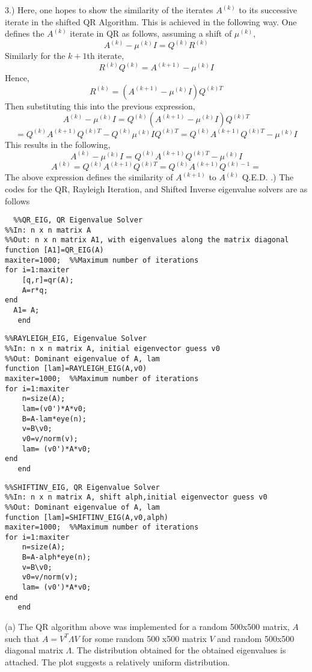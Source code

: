 \documentclass{article}
\begin{document}
3.) \newline 
Here, one hopes to show the similarity of the iterates $A^{(k)}$  to its successive iterate in the shifted QR Algorithm. This is achieved in the following way. One defines the $A^{(k)}$  iterate in QR as follows, assuming a shift of $\mu^{(k)}$, 
$$ A^{(k)} - \mu^{(k)}I = Q^{(k)}R^{(k)}$$ 
Similarly for the $k+1$th iterate, 
$$ R^{(k)}Q^{(k)} =   A^{(k+1)} -  \mu^{(k)}I $$ 
Hence, 
$$  R^{(k)} =  (A^{(k+1)} -  \mu^{(k)}I)Q^{(k)T} $$ 
Then  substituting this into the previous expression, 
$$ A^{(k)} - \mu^{(k)}I=   Q^{(k)}( A^{(k+1)} -  \mu^{(k)}I)Q^{(k)T}$$ 
$$ =Q^{(k)}A^{(k+1)}Q^{(k)T} - Q^{(k)} \mu^{(k)}IQ^{(k)T} = Q^{(k)}A^{(k+1)}Q^{(k)T} -\mu^{(k)}I  
$$ 
This results in the following, 
$$ A^{(k)} - \mu^{(k)}I =  Q^{(k)}A^{(k+1)}Q^{(k)T} -\mu^{(k)}I  $$ 
$$A^{(k)} = Q^{(k)}A^{(k+1)}Q^{(k)T} = Q^{(k)}A^{(k+1)}Q^{(k)-1} = 
$$ 
The above expression defines the similarity of $A^{(k+1)}$ to $A^{(k)}$  Q.E.D. 
\newline {}.) \newline  
The codes for the QR, Rayleigh Iteration, and Shifted Inverse eigenvalue solvers are as follows 
  \begin{lstlisting} 
  %%QR_EIG, QR Eigenvalue Solver 
%%In: n x n matrix A 
%%Out: n x n matrix A1, with eigenvalues along the matrix diagonal 
function [A1]=QR_EIG(A)  
maxiter=1000;  %%Maximum number of iterations 
for i=1:maxiter 
    [q,r]=qr(A); 
    A=r*q; 
end 
  A1= A; 
   end
 \end{lstlisting} 
\begin{lstlisting} 
%%RAYLEIGH_EIG, Eigenvalue Solver 
%%In: n x n matrix A, initial eigenvector guess v0  
%%Out: Dominant eigenvalue of A, lam 
function [lam]=RAYLEIGH_EIG(A,v0)  
maxiter=1000;  %%Maximum number of iterations 
for i=1:maxiter 
    n=size(A); 
    lam=(v0')*A*v0; 
    B=A-lam*eye(n); 
    v=B\v0; 
    v0=v/norm(v); 
    lam= (v0')*A*v0; 
end 
   end
\end{lstlisting} 
\begin{lstlisting} 
%%SHIFTINV_EIG, QR Eigenvalue Solver 
%%In: n x n matrix A, shift alph,initial eigenvector guess v0 
%%Out: Dominant eigenvalue of A, lam  
function [lam]=SHIFTINV_EIG(A,v0,alph)  
maxiter=1000;  %%Maximum number of iterations 
for i=1:maxiter 
    n=size(A); 
    B=A-alph*eye(n); 
    v=B\v0; 
    v0=v/norm(v); 
    lam= (v0')*A*v0; 
end 
   end
\end{lstlisting} 
 (a) The QR algorithm above was implemented for a random 500x500 matrix, $A$ such that $A = V^{T}\Lambda V $ for some random 500 x500 matrix $V$ and random 500x500 diagonal matrix $\Lambda$. The distribution obtained for the obtained eigenvalues is attached.  The plot suggests a relatively uniform distribution. 
 \newline 
\end{document}
